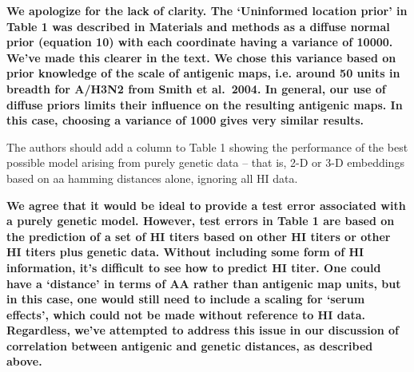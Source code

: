 \documentclass[11pt,oneside,letterpaper]{article}
\begin{document}
\textbf{We apologize for the lack of clarity.  The `Uninformed location prior' in Table 1 was described in Materials and methods as a diffuse normal prior (equation 10) with each coordinate having a variance of 10000.  We've made this clearer in the text.  We chose this variance based on prior knowledge of the scale of antigenic maps, i.e. around 50 units in breadth for A/H3N2 from Smith et al.\ 2004.  In general, our use of diffuse priors limits their influence on the resulting antigenic maps.  In this case, choosing a variance of 1000 gives very similar results.}

The authors should add a column to Table 1 showing the performance of the best possible model arising from purely genetic data -- that is, 2-D or 3-D embeddings based on aa hamming distances alone, ignoring all HI data.

\textbf{We agree that it would be ideal to provide a test error associated with a purely genetic model.  However, test errors in Table 1 are based on the prediction of a set of HI titers based on other HI titers or other HI titers plus genetic data.  Without including some form of HI information, it's difficult to see how to predict HI titer.  One could have a `distance' in terms of AA rather than antigenic map units, but in this case, one would still need to include a scaling for `serum effects', which could not be made without reference to HI data.  Regardless, we've attempted to address this issue in our discussion of correlation between antigenic and genetic distances, as described above.}



\end{document}

